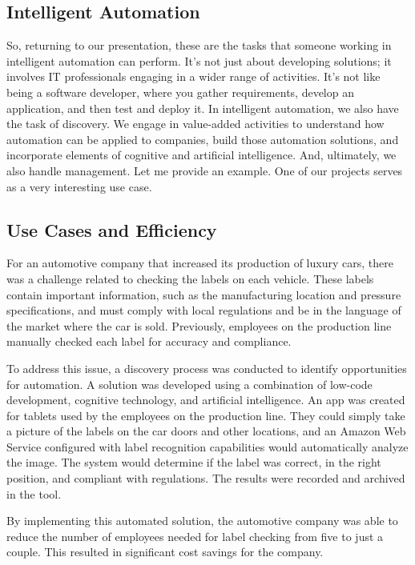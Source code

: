 \subsection{Intelligent Automation}\label{intelligent-automation}

So, returning to our presentation, these are the tasks that
someone working in intelligent automation can perform. It's not just
about developing solutions; it involves IT professionals engaging in a
wider range of activities. It's not like being a software developer,
where you gather requirements, develop an application, and then test and
deploy it. In intelligent automation, we also have the task of
discovery. We engage in value-added activities to understand how
automation can be applied to companies, build those automation
solutions, and incorporate elements of cognitive and artificial
intelligence. And, ultimately, we also handle management. Let me provide
an example. One of our projects serves as a very interesting use case.

\subsection{Use Cases and Efficiency}\label{use-cases-and-efficiency}

For an automotive company that increased its production of luxury cars,
there was a challenge related to checking the labels on each vehicle.
These labels contain important information, such as the manufacturing
location and pressure specifications, and must comply with local
regulations and be in the language of the market where the car is sold.
Previously, employees on the production line manually checked each label
for accuracy and compliance.

To address this issue, a discovery process was conducted to identify
opportunities for automation. A solution was developed using a
combination of low-code development, cognitive technology, and
artificial intelligence. An app was created for tablets used by the
employees on the production line. They could simply take a picture of
the labels on the car doors and other locations, and an Amazon Web
Service configured with label recognition capabilities would
automatically analyze the image. The system would determine if the label
was correct, in the right position, and compliant with regulations. The
results were recorded and archived in the tool.

By implementing this automated solution, the automotive company was able
to reduce the number of employees needed for label checking from five to
just a couple. This resulted in significant cost savings for the
company.

